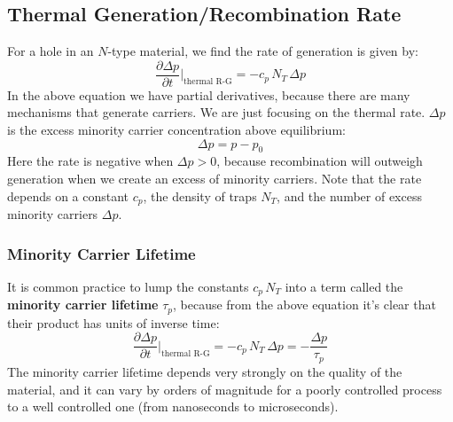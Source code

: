 \subsection{Thermal Generation/Recombination Rate}
For a hole in an $N$-type material, we find the rate of generation is given by:
    \begin{equation}
        \frac{\partial \Delta p}{\partial t} \bigg\rvert_{\text{thermal R-G}} = -c_p\,N_T\,\Delta p
    \end{equation}
In the above equation we have partial derivatives, because there are many mechanisms that generate carriers.  We are just focusing on the thermal rate.  $\Delta p$ is the excess minority carrier concentration above equilibrium:
    \begin{equation}
        \Delta p = p - p_0
    \end{equation}
Here the rate is negative when $\Delta p > 0$, because recombination will outweigh generation when we create an excess of minority carriers.  Note that the rate depends on a constant $c_p$, the density of traps $N_T$, and the number of excess minority carriers $\Delta p$.  
\subsubsection*{Minority Carrier Lifetime}
It is common practice to lump the constants $c_p\,N_T$ into a term called the \textbf{minority carrier lifetime} $\tau_p$, because from the above equation it's clear that their product has units of inverse time:
    \begin{equation}
        \frac{\partial \Delta p}{\partial t} \bigg\rvert_{\text{thermal R-G}} = - c_p\,N_T\,\Delta p = -\frac{\Delta p}{\tau_p}
        \label{eq:lifetime}
    \end{equation} 
The minority carrier lifetime depends very strongly on the quality of the material, and it can vary by orders of magnitude for a poorly controlled process to a well controlled one (from nanoseconds to microseconds).
